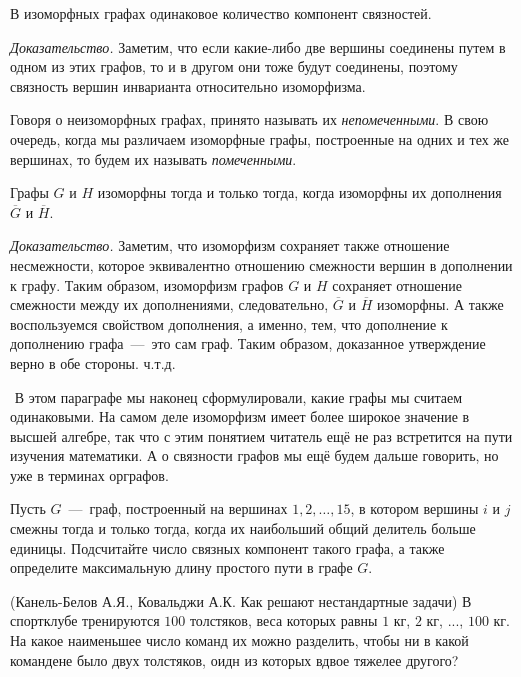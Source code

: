\begin{statement}
	В изоморфных графах одинаковое количество компонент связностей.
	
	\emph{Доказательство.} Заметим, что если какие-либо две вершины соединены путем в одном из этих графов, 
	то и в другом они тоже будут соединены, поэтому связность вершин инварианта относительно изоморфизма.
\end{statement}

	Говоря о неизоморфных графах, принято называть их \emph{непомеченными}. В свою очередь, когда мы различаем изоморфные графы, 
	построенные на одних и тех же вершинах, то будем их называть \emph{помеченными}.


\begin{statement}
	Графы $G$ и $H$ изоморфны тогда и только тогда, когда изоморфны их дополнения $\overline{G}$ и $\overline{H}$.
	
	\emph{Доказательство.} Заметим, что изоморфизм сохраняет также отношение несмежности, которое эквивалентно отношению 
	смежности вершин в дополнении к графу. Таким образом, изоморфизм графов $G$ и $H$ сохраняет отношение смежности между их дополнениями, 
	следовательно, $\overline{G}$ и $\overline{H}$ изоморфны. А также воспользуемся свойством дополнения, а именно, тем, 
	что дополнение к дополнению графа~---~это сам граф. Таким образом, доказанное утверждение верно в обе стороны. ч.т.д.
\end{statement}
$ $
\newline
	В этом параграфе мы наконец сформулировали, какие графы мы считаем одинаковыми. На самом деле изоморфизм имеет более 
	широкое значение в высшей алгебре, так что с этим понятием читатель ещё не раз встретится на пути изучения математики. 
	А о связности графов мы ещё будем дальше говорить, но уже в терминах орграфов.


\begin{exersize}
	Пусть $G$~---~граф, построенный на вершинах $1, 2, \dots, 15$, в котором вершины $i$ и $j$ смежны тогда и только тогда, 
	когда их наибольший общий делитель больше единицы. Подсчитайте число связных компонент такого графа, а также определите 
	максимальную длину простого пути в графе $G$.
\end{exersize}

\begin{exersize}(Канель-Белов А.Я., Ковальджи А.К. Как решают нестандартные задачи)
	В спортклубе тренируются $100$ толстяков, веса которых равны $1$ кг, $2$ кг, ..., $100$ кг. На какое наименьшее 
	число команд их можно разделить, чтобы ни в какой командене было двух толстяков, оидн из которых вдвое тяжелее другого?
\end{exersize}


